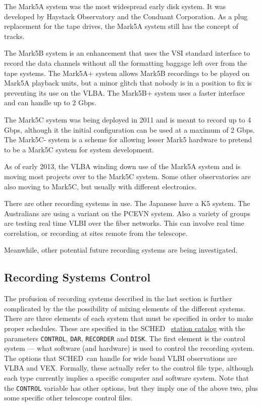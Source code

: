 \documentclass{report}
\newcommand{\schedb}{{\sc SCHED~}}
\begin{document}
The Mark5A system was the most widespread early disk system.  It was
developed by Haystack Observatory and the Conduant Corporation.  As a
plug replacement for the tape drives, the Mark5A system still has the
concept of tracks.  

The Mark5B system is an enhancement that uses the VSI standard
interface to record the data channels without all the formatting
baggage left over from the tape systems.  The Mark5A+ system allows
Mark5B recordings to be played on Mark5A playback units, but a minor
glitch that nobody is in a position to fix is preventing its use on
the VLBA.  The Mark5B+ system uses a faster interface and can handle
up to 2 Gbps.  

The Mark5C system was being deployed in 2011 and is meant to record up
to 4 Gbps, although it the initial configuration can be used at a
maximum of 2 Gbps.  The Mark5C- system is a scheme for allowing lesser
Mark5 hardware to pretend to be a Mark5C system for system
development.  

As of early 2013, the VLBA winding down use of the Mark5A
system and is moving most projects over to the Mark5C system.  Some 
other observatories are also moving to Mark5C, but usually with
different electronics.

There are other recording systems in use.  The Japanese have a K5
system.  The Australians are using a variant on the PCEVN system.
Also a variety of groups are testing real time VLBI over the fiber
networks.  This can involve real time correlation, or recording at
sites remote from the telescope.

Meanwhile, other potential future recording systems are being
investigated.


\subsection{\label{SSEC:RECCONTROL}Recording Systems Control}

The profusion of recording systems described in the last section is
further complicated by the the possibility of mixing elements of the
different systems.  There are three elements of each system that must
be specified in order to make proper schedules.  These are specified
in the \schedb 
{\hyperref[SEC:STACAT]{station catalog}} with the
parameters {\tt CONTROL}, {\tt DAR}, {\tt RECORDER} and {\tt DISK}.
The first element is the control system --- what software (and
hardware) is used to control the recording system.  The options that
\schedb can handle for wide band VLBI observations are VLBA and VEX.
Formally, these actually refer to the control file type, although each
type currently implies a specific computer and software system.  Note
that the {\tt CONTROL} variable has other options, but they imply one
of the above two, plus some specific other telescope control files.
\end{document}
